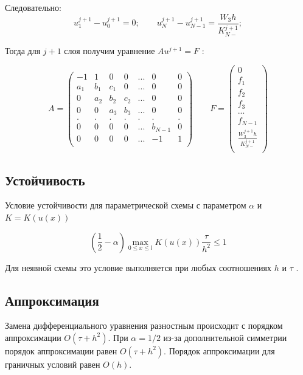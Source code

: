 \documentclass[a4paper,12pt]{article}
\begin{document}
Следовательно:
\begin{equation}
u_1^{j+1} - u_0^{j+1} = 0;   \qquad
u_N^{j+1} - u_{N-1}^{j+1} =  \frac{W_3h}{K_{N-}^{j+1}};
\end{equation}

\newpage
Тогда для \(j+1\) слоя получим уравнение \(Au^{j+1} = F\) :


\begin{displaymath}
 A = \left( \begin{array}{ccccccc}
-1 & 1 & 0 & 0 & ... & 0 & 0 \\
a_1 & b_1 & c_1 & 0 & ... & 0 & 0 \\
0 & a_2 & b_2 & c_2 & ... & 0 & 0 \\
0 & 0 & a_3 & b_3 & ... & 0 & 0 \\
. & . & . & . & . & . & . \\
0 & 0 & 0 & 0 & ... & b_{N-1} & 0 \\
0 & 0 & 0 & 0 & ... & -1 & 1 \\
\end{array}
\right)  \qquad
 F = \left( \begin{array}{c}
0 \\
f_1 \\
f_2 \\
f_3 \\
... \\
f_{N-1} \\
\frac{W_3^{j+1}h}{K_{N-}^{j+1}} \\
\end{array}
\right) 
\end{displaymath}

\subsection{Устойчивость}
Условие устойчивости для параметрической схемы с параметром $\alpha$ и \(K = K(u(x))\)

\begin{equation}
(\frac{1}{2} - \alpha)\max_{0\le x \le l}K(u(x))\frac{\tau}{h^2} \le 1
\end{equation}
 
Для неявной схемы это условие выполняется при любых соотношениях $h$ и $\tau$ .

\subsection{Аппроксимация}
Замена дифференциального уравнения разностным происходит с порядком аппроксимации $O(\tau + h^2)$. При  $\alpha = 1/2$ из-за дополнительной симметрии порядок аппроксимации равен $O(\tau + h^2)$. Порядок аппроксимации для граничных условий равен $O(h)$.
\end{document}
